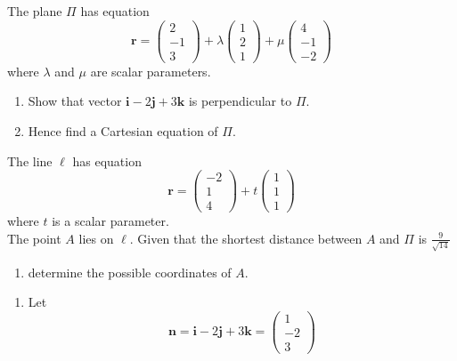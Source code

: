 \documentclass[leqno]{article}
\begin{document}
\begin{enumerate}[
  label=\textbf{\arabic*.},
  leftmargin=*,
  topsep=0pt,
  partopsep=0pt,
  parsep=0pt
]
The plane $\Pi$ has equation
\[
\mathbf{r}=\begin{pmatrix}2\\-1\\3\end{pmatrix}+\lambda\begin{pmatrix}1\\2\\1\end{pmatrix}+\mu\begin{pmatrix}4\\-1\\-2\end{pmatrix}
\]
where $\lambda$ and $\mu$ are scalar parameters. \\
\begin{enumerate}[label=\textbf{(\alph*)}]
  \item Show that vector $\mathbf{i}-2\mathbf{j}+3\mathbf{k}$ is perpendicular to $\Pi$.  \\
  \item Hence find a Cartesian equation of $\Pi$.  \\
\end{enumerate}
The line $\ell$ has equation
\[
\mathbf{r}=\begin{pmatrix}-2\\1\\4\end{pmatrix}+t\begin{pmatrix}1\\1\\1\end{pmatrix}
\]
where $t$ is a scalar parameter. \\

The point $A$ lies on $\ell$. Given that the shortest distance between $A$ and $\Pi$ is $\tfrac{9}{\sqrt{14}}$ \\
\begin{enumerate}[label=\textbf{(\alph*)}, resume]
  \item determine the possible coordinates of $A$.  \\
\end{enumerate}

\vspace*{10pt}

\begin{djsSolution}
\begin{enumerate}[label=\textbf{(\alph*)}]
  \item Let
  \[
  \mathbf n=\mathbf i-2\mathbf j+3\mathbf k=\begin{pmatrix}1\\-2\\3\end{pmatrix}
  \]
  

\end{enumerate}
\end{djsSolution}
\end{enumerate}
\end{document}
